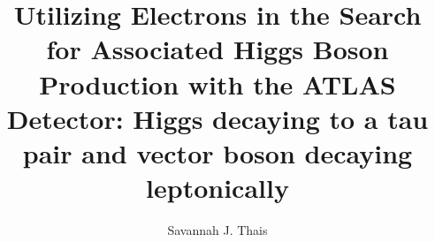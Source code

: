 \title{Utilizing Electrons in the Search for Associated Higgs Boson Production with the ATLAS Detector: Higgs decaying to a tau pair and vector boson decaying leptonically}
\author{Savannah J. Thais}



